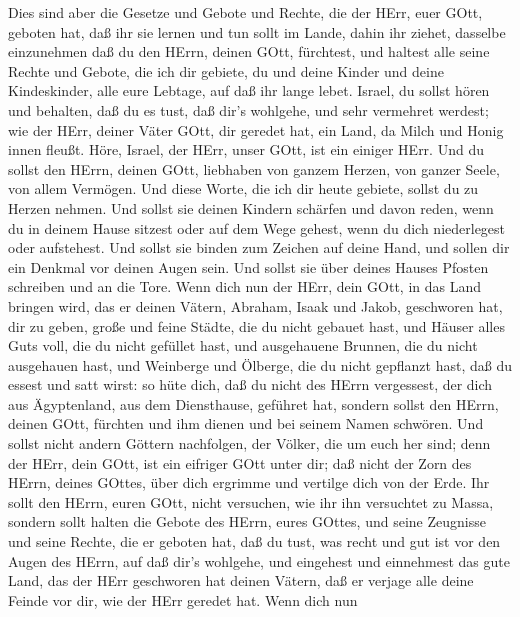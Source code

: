  Dies sind aber die Gesetze und Gebote und Rechte, die der
HErr, euer GOtt, geboten hat, daß ihr sie lernen und tun sollt im Lande,
dahin ihr ziehet, dasselbe einzunehmen  daß du den HErrn,
deinen GOtt, fürchtest, und haltest alle seine Rechte und Gebote, die
ich dir gebiete, du und deine Kinder und deine Kindeskinder, alle eure
Lebtage, auf daß ihr lange lebet.  Israel, du sollst hören
und behalten, daß du es tust, daß dir's wohlgehe, und sehr vermehret
werdest; wie der HErr, deiner Väter GOtt, dir geredet hat, ein Land, da
Milch und Honig innen fleußt.  Höre, Israel, der HErr, unser
GOtt, ist ein einiger HErr.  Und du sollst den HErrn, deinen
GOtt, liebhaben von ganzem Herzen, von ganzer Seele, von allem Vermögen.
 Und diese Worte, die ich dir heute gebiete, sollst du zu
Herzen nehmen.  Und sollst sie deinen Kindern schärfen und
davon reden, wenn du in deinem Hause sitzest oder auf dem Wege gehest,
wenn du dich niederlegest oder aufstehest.  Und sollst sie
binden zum Zeichen auf deine Hand, und sollen dir ein Denkmal vor deinen
Augen sein.  Und sollst sie über deines Hauses Pfosten
schreiben und an die Tore.  Wenn dich nun der HErr, dein
GOtt, in das Land bringen wird, das er deinen Vätern, Abraham, Isaak und
Jakob, geschworen hat, dir zu geben, große und feine Städte, die du
nicht gebauet hast,  und Häuser alles Guts voll, die du
nicht gefüllet hast, und ausgehauene Brunnen, die du nicht ausgehauen
hast, und Weinberge und Ölberge, die du nicht gepflanzt hast, daß du
essest und satt wirst:  so hüte dich, daß du nicht des
HErrn vergessest, der dich aus Ägyptenland, aus dem Diensthause,
geführet hat,  sondern sollst den HErrn, deinen GOtt,
fürchten und ihm dienen und bei seinem Namen schwören.  Und
sollst nicht andern Göttern nachfolgen, der Völker, die um euch her
sind;  denn der HErr, dein GOtt, ist ein eifriger GOtt
unter dir; daß nicht der Zorn des HErrn, deines GOttes, über dich
ergrimme und vertilge dich von der Erde.  Ihr sollt den
HErrn, euren GOtt, nicht versuchen, wie ihr ihn versuchtet zu Massa,
 sondern sollt halten die Gebote des HErrn, eures GOttes,
und seine Zeugnisse und seine Rechte, die er geboten hat, 
daß du tust, was recht und gut ist vor den Augen des HErrn, auf daß
dir's wohlgehe, und eingehest und einnehmest das gute Land, das der HErr
geschworen hat deinen Vätern,  daß er verjage alle deine
Feinde vor dir, wie der HErr geredet hat.  Wenn dich nun

